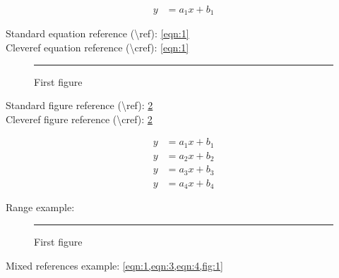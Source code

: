 \documentclass[11pt]{article}
\begin{document}
\begin{align}
y&=a_1x+b_1\label{eqn:1}
\end{align}

\noindent
Standard equation reference (\textbackslash ref): \ref{eqn:1}\\
Cleveref equation reference (\textbackslash cref): \cref{eqn:1}

\begin{figure}[ht]\centering\rule{0.5\linewidth}{0.1\linewidth}\caption{First figure}\label{fig:1}\end{figure}

\noindent
Standard figure reference (\textbackslash ref): \ref{fig:1}\\
Cleveref figure reference (\textbackslash cref): \cref{fig:1}

\begin{align}
y&=a_1x+b_1\label{eqn:1}\\
y&=a_2x+b_2\label{eqn:2}\\
y&=a_3x+b_3\label{eqn:3}\\
y&=a_4x+b_4\label{eqn:4}
\end{align}

\noindent
Range example: 

\begin{figure}[ht]\centering\rule{0.5\linewidth}{0.1\linewidth}\caption{First figure}\label{fig:1}\end{figure}

\noindent
Mixed references example: \cref{eqn:1,eqn:3,eqn:4,fig:1}
\end{document}
